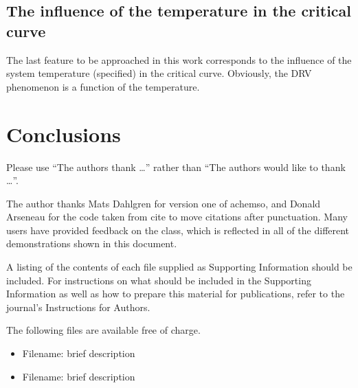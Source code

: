 \documentclass[journal=iecred,manuscript=article]{achemso}
\theoremstyle{definition}
\theoremstyle{remark}
\begin{document}
\subsection{The influence of the temperature in the critical curve}

The last feature to be approached in this work corresponds to the influence of the system temperature (specified) in the critical curve. Obviously, the DRV phenomenon is a function of the temperature. 

\section{Conclusions}


\begin{acknowledgement}

Please use \enquote{The authors thank \ldots} rather than \enquote{The
authors would like to thank \ldots}.

The author thanks Mats Dahlgren for version one of \textsf{achemso},
and Donald Arseneau for the code taken from \textsf{cite} to move
citations after punctuation. Many users have provided feedback on the
class, which is reflected in all of the different demonstrations
shown in this document.

\end{acknowledgement}

\begin{suppinfo}

A listing of the contents of each file supplied as Supporting Information
should be included. For instructions on what should be included in the
Supporting Information as well as how to prepare this material for
publications, refer to the journal's Instructions for Authors.

The following files are available free of charge.
\begin{itemize}
  \item Filename: brief description
  \item Filename: brief description
\end{itemize}

\end{suppinfo}


\end{document}
